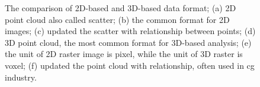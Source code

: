 \begin{figure}[htb!]
  \begin{center}
  \end{center}
  \caption[The compairson of 2D-based and 3D-based data format]{
    The comparison of 2D-based and 3D-based data format; (a) 2D point cloud also called scatter; (b) the common format for 2D images; (c) updated the scatter with relationship between points; (d) 3D point cloud, the most common format for 3D-based analysis; (e) the unit of 2D raster image is pixel, while the unit of 3D raster is voxel; (f) updated the point cloud with relationship, often used in \gls{cg} industry.
  }
  \label{fig:int3}
\end{figure}